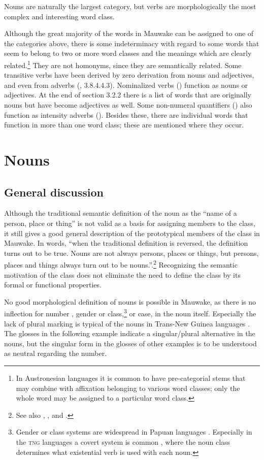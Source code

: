 Nouns are naturally the largest category, but verbs are morphologically the most complex and interesting word class.

Although the great majority of the words in Mauwake can be assigned to one of the categories above, there is some indeterminacy with regard to some words that seem to belong to two or more word classes and the meanings which are clearly related.\footnote{In Austronesian languages it is common to have pre-categorial stems that may combine with affixation belonging to various word classes; only the whole word may be assigned to a particular word class.} They are not homonyms, since they are semantically related. Some transitive verbs have been derived by zero derivation from nouns and adjectives, and even from adverbs (, 3.8.4.4.3). Nominalized verbs () function as nouns or adjectives. At the end of section 3.2.2 there is a list of words that are originally nouns but have become adjectives as well. Some non-numeral quantifiers () also function as intensity adverbs (). Besides these, there are individual words that function in more than one word class; these are mentioned where they occur.

\section{Nouns}\label{sec:3.2}
{}
\subsection{General discussion}\label{sec:3:2:1}
{}
Although the traditional semantic definition of the noun as the ``name of a person, place or thing'' is not valid as a basis for assigning members to the class, it still gives a good general description of the prototypical members of the class in Mauwake. In  words, ``when the traditional definition is reversed, the definition turns out to be true. Nouns are not always persons, places or things, but persons, places and things always turn out to be nouns.''.\footnote{See also \citet[117]{Sapir1921}, \citet[60]{Jespersen1924}, \citet[449]{Lyons1977} and \citet[7]{Schachter1985}.} Recognizing the semantic motivation of the class does not eliminate the need to define the class by its formal or functional properties.

No good morphological definition of nouns is possible in Mauwake, as there is no inflection for number , gender or class,\footnote{Gender or class systems are widespread in Papuan languages \citep[77]{Foley1986}. Especially in the \textsc{tng} languages a covert system is common \citep[58]{Wurm1982}, where the noun class determines what existential verb is used with each noun.} or case, in the noun itself. Especially the lack of plural marking is typical of the nouns in Trans-New Guinea languages \citep[36]{Wurm1982}. The glosses in the following example indicate a singular/plural alternative in the nouns, but the singular form in the glosses of other examples is to be understood as neutral regarding the number. 

